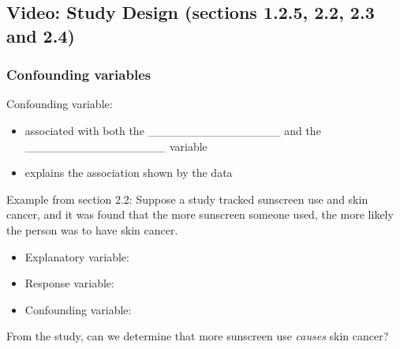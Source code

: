 \documentclass[
]{report}
\providecommand{\tightlist}{%
  \setlength{\itemsep}{0pt}\setlength{\parskip}{0pt}}
\begin{document}

\subsection*{Video: Study Design (sections 1.2.5, 2.2, 2.3 and 2.4)}\label{video-study-design-sections-1.2.5-2.2-2.3-and-2.4}

\subsubsection*{Confounding variables}\label{confounding-variables}


Confounding variable:

\begin{itemize}
\item
  associated with both the \_\_\_\_\_\_\_\_\_\_\_\_\_\_\_\_ and the \_\_\_\_\_\_\_\_\_\_\_\_\_\_\_\_\_ variable
\item
  explains the association shown by the data
\end{itemize}


Example from section 2.2: Suppose a study tracked sunscreen use and skin cancer, and it was found that the more sunscreen someone used, the more likely the person was to have skin cancer.

\begin{itemize}
\tightlist
\item
  Explanatory variable:
\end{itemize}

\vspace{0.2 in}

\begin{itemize}
\tightlist
\item
  Response variable:
\end{itemize}

\vspace{0.2 in}

\begin{itemize}
\tightlist
\item
  Confounding variable:
\end{itemize}

\vspace{0.2 in}

From the study, can we determine that more sunscreen use \emph{causes} skin cancer?
\end{document}
